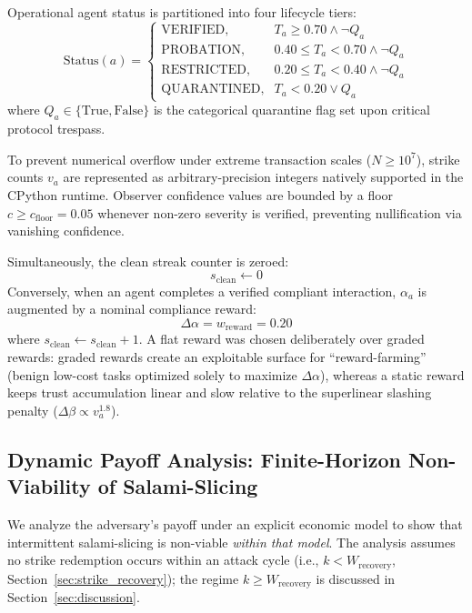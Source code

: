 \documentclass[manuscript, screen, review]{jair}
\begin{document}
Operational agent status is partitioned into four lifecycle tiers:
\begin{equation}
\text{Status}(a) =
\begin{cases}
\text{VERIFIED}, & T_a \ge 0.70 \land \neg Q_a \\
\text{PROBATION}, & 0.40 \le T_a < 0.70 \land \neg Q_a \\
\text{RESTRICTED}, & 0.20 \le T_a < 0.40 \land \neg Q_a \\
\text{QUARANTINED}, & T_a < 0.20 \lor Q_a
\end{cases}
\label{eq:lifecycle_tiers}
\end{equation}
where $Q_a \in \{\text{True}, \text{False}\}$ is the categorical quarantine flag set upon critical protocol trespass.

To prevent numerical overflow under extreme transaction scales ($N \ge 10^7$), strike counts $v_a$ are represented as arbitrary-precision integers natively supported in the CPython runtime. Observer confidence values are bounded by a floor $c \ge c_{\text{floor}} = 0.05$ whenever non-zero severity is verified, preventing nullification via vanishing confidence.

Simultaneously, the clean streak counter is zeroed:
\begin{equation}
s_{\text{clean}} \leftarrow 0
\end{equation}
Conversely, when an agent completes a verified compliant interaction, $\alpha_a$ is augmented by a nominal compliance reward:
\begin{equation}
\Delta\alpha = w_{\text{reward}} = 0.20
\label{eq:positive_reward}
\end{equation}
where $s_{\text{clean}} \leftarrow s_{\text{clean}} + 1$. A flat reward was chosen deliberately over graded rewards: graded rewards create an exploitable surface for ``reward-farming'' (benign low-cost tasks optimized solely to maximize $\Delta\alpha$), whereas a static reward keeps trust accumulation linear and slow relative to the superlinear slashing penalty ($\Delta\beta \propto v_a^{1.8}$).

\subsection{Dynamic Payoff Analysis: Finite-Horizon Non-Viability of Salami-Slicing}

We analyze the adversary's payoff under an explicit economic model to show that intermittent salami-slicing is non-viable \emph{within that model}. The analysis assumes no strike redemption occurs within an attack cycle (i.e., $k < W_{\text{recovery}}$, Section~\ref{sec:strike_recovery}); the regime $k \ge W_{\text{recovery}}$ is discussed in Section~\ref{sec:discussion}.
\end{document}
